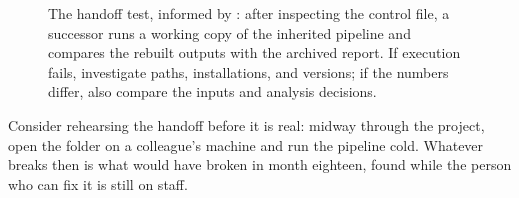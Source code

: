 \documentclass[
    a4paper,
    fontsize=10pt,
    twoside=true,
    numbers=noenddot,
]{kaobook}
\begin{document}
\begin{figure}[htbp]
\centering
{}
\caption[The handoff test: run before you read]{The handoff test, informed by \textcite{pilgrim2023code}: after inspecting the control file, a successor runs a working copy of the inherited pipeline and compares the rebuilt outputs with the archived report. If execution fails, investigate paths, installations, and versions; if the numbers differ, also compare the inputs and analysis decisions.}
\label{fig:ch02-viz-handoff}
\end{figure}

Consider rehearsing the handoff before it is real: midway through the project, open the folder on a colleague's machine and run the pipeline cold. Whatever breaks then is what would have broken in month eighteen, found while the person who can fix it is still on staff.
\end{document}
